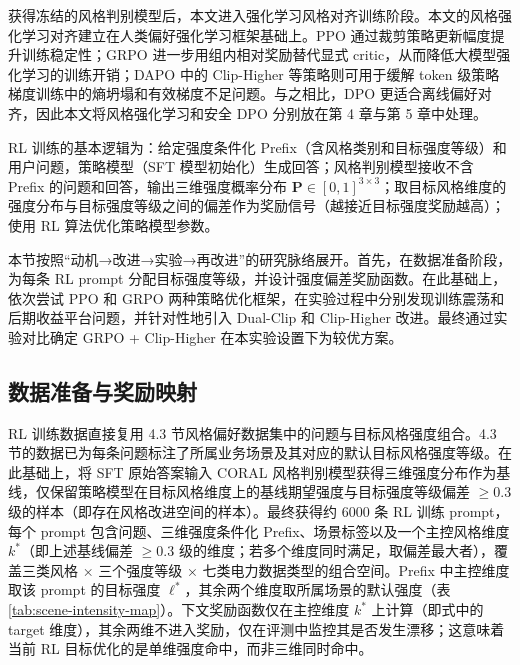 \documentclass[fontset=fandol,type=master,campus=shenzhen,etitleauto=true]{hithesisbook}
\begin{document}
获得冻结的风格判别模型后，本文进入强化学习风格对齐训练阶段。本文的风格强化学习对齐建立在人类偏好强化学习框架基础上\cite{ref30,ref31,ref32}。PPO 通过裁剪策略更新幅度提升训练稳定性\cite{ref33}；GRPO 进一步用组内相对奖励替代显式 critic，从而降低大模型强化学习的训练开销\cite{ref34}；DAPO 中的 Clip-Higher 等策略则可用于缓解 token 级策略梯度训练中的熵坍塌和有效梯度不足问题\cite{ref35}。与之相比，DPO 更适合离线偏好对齐\cite{ref40}，因此本文将风格强化学习和安全 DPO 分别放在第 4 章与第 5 章中处理。

RL 训练的基本逻辑为：给定强度条件化 Prefix（含风格类别和目标强度等级）和用户问题，策略模型（SFT 模型初始化）生成回答；风格判别模型接收不含 Prefix 的问题和回答，输出三维强度概率分布 $\mathbf{P} \in [0,1]^{3 \times 3}$；取目标风格维度的强度分布与目标强度等级之间的偏差作为奖励信号（越接近目标强度奖励越高）；使用 RL 算法优化策略模型参数。

本节按照``动机→改进→实验→再改进''的研究脉络展开。首先，在数据准备阶段，为每条 RL prompt 分配目标强度等级，并设计强度偏差奖励函数。在此基础上，依次尝试 PPO 和 GRPO 两种策略优化框架，在实验过程中分别发现训练震荡和后期收益平台问题，并针对性地引入 Dual-Clip 和 Clip-Higher 改进。最终通过实验对比确定 GRPO + Clip-Higher 在本实验设置下为较优方案。

\subsection{数据准备与奖励映射}\label{ux6570ux636eux51c6ux5907ux4e0eux5956ux52b1ux6620ux5c04}

RL 训练数据直接复用 4.3 节风格偏好数据集中的问题与目标风格强度组合。4.3 节的数据已为每条问题标注了所属业务场景及其对应的默认目标风格强度等级。在此基础上，将 SFT 原始答案输入 CORAL 风格判别模型获得三维强度分布作为基线，仅保留策略模型在目标风格维度上的基线期望强度与目标强度等级偏差 $\geq 0.3$ 级的样本（即存在风格改进空间的样本）。最终获得约 6000 条 RL 训练 prompt，每个 prompt 包含问题、三维强度条件化 Prefix、场景标签以及一个主控风格维度 $k^*$（即上述基线偏差 $\geq 0.3$ 级的维度；若多个维度同时满足，取偏差最大者），覆盖三类风格 × 三个强度等级 × 七类电力数据类型的组合空间。Prefix 中主控维度取该 prompt 的目标强度 $\ell^*$，其余两个维度取所属场景的默认强度（表 \ref{tab:scene-intensity-map}）。下文奖励函数仅在主控维度 $k^*$ 上计算（即式中的 target 维度），其余两维不进入奖励，仅在评测中监控其是否发生漂移；这意味着当前 RL 目标优化的是单维强度命中，而非三维同时命中。
\end{document}
